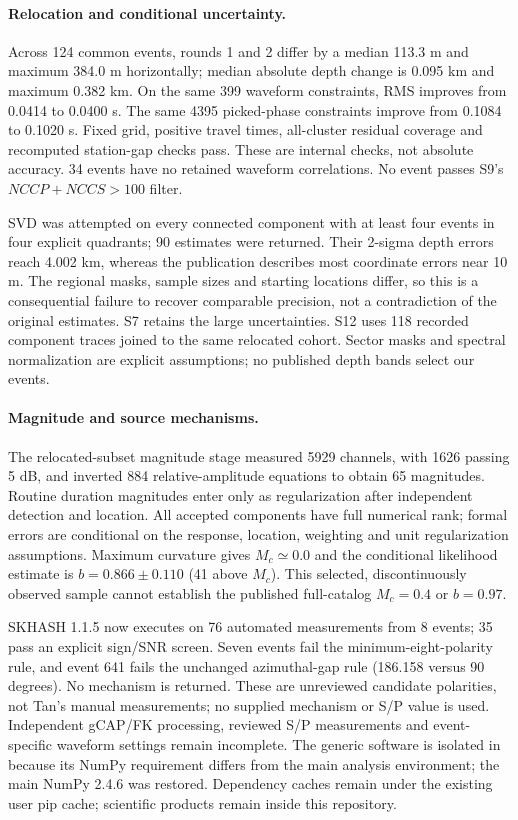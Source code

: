 \paragraph{Relocation and conditional uncertainty.}
Across 124 common events, rounds 1 and 2 differ by a median 113.3 m and maximum 384.0 m horizontally; median absolute depth change is 0.095 km and maximum 0.382 km. On the same 399 waveform constraints, RMS improves from 0.0414 to 0.0400 s. The same 4395 picked-phase constraints improve from 0.1084 to 0.1020 s. Fixed grid, positive travel times, all-cluster residual coverage and recomputed station-gap checks pass. These are internal checks, not absolute accuracy. 34 events have no retained waveform correlations. No event passes S9's $NCCP+NCCS>100$ filter.

SVD was attempted on every connected component with at least four events in four explicit quadrants; 90 estimates were returned. Their 2-sigma depth errors reach 4.002 km, whereas the publication describes most coordinate errors near 10 m. The regional masks, sample sizes and starting locations differ, so this is a consequential failure to recover comparable precision, not a contradiction of the original estimates. S7 retains the large uncertainties. S12 uses 118 recorded component traces joined to the same relocated cohort. Sector masks and spectral normalization are explicit assumptions; no published depth bands select our events.

\paragraph{Magnitude and source mechanisms.}
The relocated-subset magnitude stage measured 5929 channels, with 1626 passing 5 dB, and inverted 884 relative-amplitude equations to obtain 65 magnitudes. Routine duration magnitudes enter only as regularization after independent detection and location. All accepted components have full numerical rank; formal errors are conditional on the response, location, weighting and unit regularization assumptions. Maximum curvature gives $M_c\simeq 0.0$ and the conditional likelihood estimate is $b=0.866\pm 0.110$ (41 above $M_c$). This selected, discontinuously observed sample cannot establish the published full-catalog $M_c=0.4$ or $b=0.97$.

SKHASH 1.1.5 now executes on 76 automated measurements from 8 events; 35 pass an explicit sign/SNR screen. Seven events fail the minimum-eight-polarity rule, and event 641 fails the unchanged azimuthal-gap rule (186.158 versus 90 degrees). No mechanism is returned. These are unreviewed candidate polarities, not Tan's manual measurements; no supplied mechanism or S/P value is used. Independent gCAP/FK processing, reviewed S/P measurements and event-specific waveform settings remain incomplete. The generic software is isolated in  because its NumPy requirement differs from the main analysis environment; the main NumPy 2.4.6 was restored. Dependency caches remain under the existing user pip cache; scientific products remain inside this repository.

